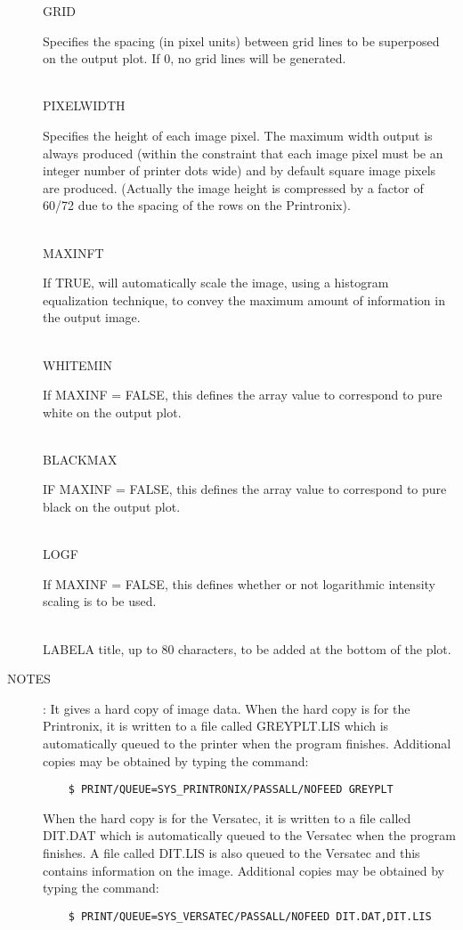 \begin{description}
\begin{tabbing}
GRID\>\begin{minipage}[t]{100mm}
Specifies the spacing (in pixel units) between grid lines to be superposed on
the output plot.
If 0, no grid lines will be generated.
\end{minipage}\\
PIXEL\>WIDTH\>\begin{minipage}[t]{100mm}
Specifies the height of each image pixel.
The maximum width output is always produced (within the constraint that each
image pixel must be an integer number of printer dots wide) and by default
square image pixels are produced.
(Actually the image height is compressed by a factor of 60/72 due to the
spacing of the rows on the Printronix).
\end{minipage}\\
MAXINF\>T\>\begin{minipage}[t]{100mm}
If TRUE, will automatically scale the image, using a histogram equalization
technique, to convey the maximum amount of information in the output image.
\end{minipage}\\
WHITE\>MIN\>\begin{minipage}[t]{100mm}
If MAXINF = FALSE, this defines the array value to correspond to pure white on
the output plot.
\end{minipage}\\
BLACK\>MAX\>\begin{minipage}[t]{100mm}
IF MAXINF = FALSE, this defines the array value to correspond to pure black on
the output plot.
\end{minipage}\\
LOG\>F\>\begin{minipage}[t]{100mm}
If MAXINF = FALSE, this defines whether or not logarithmic intensity scaling is
to be used.
\end{minipage}\\
LABEL\>\>A title, up to 80 characters, to be added at the bottom of the plot.
\end{tabbing}
\item [NOTES]:
It gives a hard copy of image data.
When the hard copy is for the Printronix, it is written to a file called
GREYPLT.LIS which is automatically queued to the printer when the program
finishes.
Additional copies may be obtained by typing the command:
\begin{verbatim}
    $ PRINT/QUEUE=SYS_PRINTRONIX/PASSALL/NOFEED GREYPLT
\end{verbatim}
When the hard copy is for the Versatec, it is written to a file called
DIT.DAT which is automatically queued to the Versatec when the program finishes.
A file called DIT.LIS is also queued to the Versatec and this contains
information on the image.
Additional copies may be obtained by typing the command:
\begin{verbatim} 
    $ PRINT/QUEUE=SYS_VERSATEC/PASSALL/NOFEED DIT.DAT,DIT.LIS
\end{verbatim}
\end{description}

